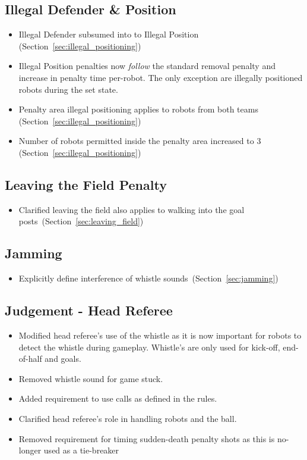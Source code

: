 \subsection*{Illegal Defender \& Position}
\begin{itemize}
  \item Illegal Defender subsumed into to Illegal Position (\cf Section~\ref{sec:illegal_positioning})
  \item Illegal Position penalties now \textit{follow} the standard removal penalty and increase in penalty time per-robot. The only exception are illegally positioned robots during the set state.
  \item Penalty area illegal positioning applies to robots from both teams (\cf Section~\ref{sec:illegal_positioning})
  \item Number of robots permitted inside the penalty area increased to 3 (\cf Section~\ref{sec:illegal_positioning})
\end{itemize}

\subsection*{Leaving the Field Penalty}
\begin{itemize}
  \item Clarified leaving the field also applies to walking into the goal posts~(\cf Section~\ref{sec:leaving_field})
\end{itemize}

\subsection*{Jamming}
\begin{itemize}
  \item Explicitly define interference of whistle sounds~(\cf Section~\ref{sec:jamming})
\end{itemize}

\subsection*{Judgement - Head Referee}
\begin{itemize}
  \item Modified head referee's use of the whistle as it is now important for robots to detect the whistle during gameplay. Whistle's are only used for kick-off, end-of-half and goals.
  \item Removed whistle sound for game stuck.
  \item Added requirement to use calls as defined in the rules.
  \item Clarified head referee's role in handling robots and the ball.
  \item Removed requirement for timing sudden-death penalty shots as this is no-longer used as a tie-breaker
\end{itemize}

